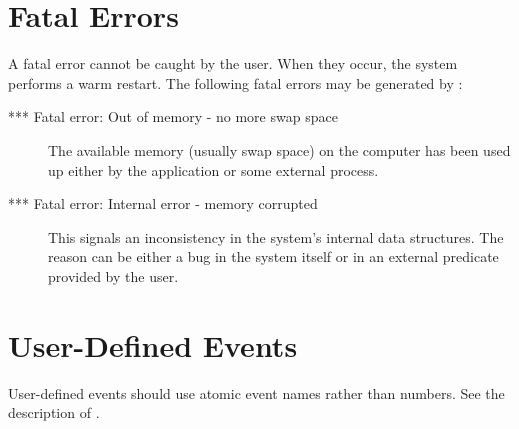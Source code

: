 \section{{\eclipse} Fatal Errors}

A fatal error cannot be caught by the user.
When they occur, the system performs a warm restart.
The following fatal errors may be generated by {\eclipse}:
\begin{description}
\item[*** Fatal error: Out of memory - no more swap space]
The available memory (usually swap space) on the computer has been used up
either by the application or some external process.

\item[*** Fatal error: Internal error - memory corrupted]
This signals an inconsistency in the system's internal data structures.
The reason can be either a bug in the {\eclipse} system itself or in an
external predicate provided by the user.

\end{description}

\section{User-Defined Events}
User-defined events should use atomic event names rather than numbers.
See the description of
.


